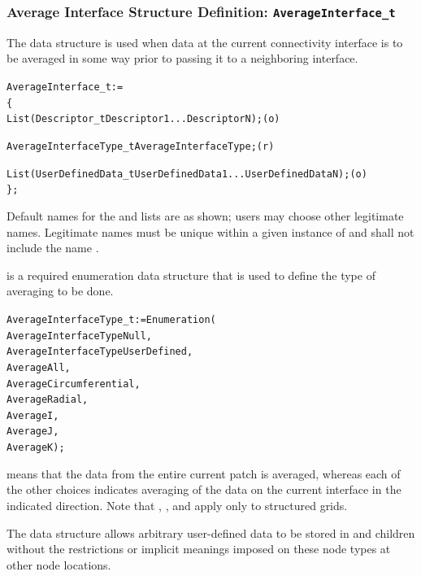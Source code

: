 \subsubsection{Average Interface Structure Definition: \texttt{AverageInterface\_t}}
\label{s:AverageInterface}

The  data structure is used when data at the
current connectivity interface is to be averaged in some way prior to
passing it to a neighboring interface.

\begin{alltt}
  AverageInterface\_t :=
    \{
    List( Descriptor\_t Descriptor1 ... DescriptorN ) ;                      (o)

    AverageInterfaceType\_t AverageInterfaceType ;                           (r)

    List( UserDefinedData\_t UserDefinedData1 ... UserDefinedDataN ) ;       (o)
    \} ;
\end{alltt}

\begin{notes}
\item
 Default names for the  and
  lists are as shown; users may choose other
 legitimate names.
 Legitimate names must be unique within a given instance of
  and shall not include the name
 .
\end{notes}

 is a required enumeration data structure
that is used to define the type of averaging to be done.
\begin{alltt}
  AverageInterfaceType_t := Enumeration(
    AverageInterfaceTypeNull,
    AverageInterfaceTypeUserDefined,
    AverageAll,
    AverageCircumferential,
    AverageRadial,
    AverageI,
    AverageJ,
    AverageK ) ;
\end{alltt}

 means that the data from the entire current patch is
averaged, whereas each of the other choices indicates averaging of the
data on the current interface in the indicated direction.
Note that , , and 
apply only to structured grids.

The  data structure allows arbitrary
user-defined data to be stored in  and
 children without the restrictions or implicit
meanings imposed on these node types at other node locations.

